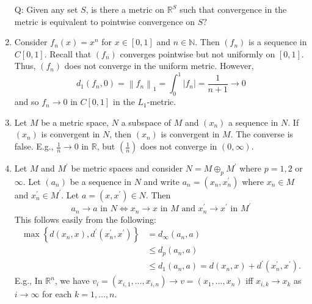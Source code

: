 \documentclass[a4paper,11pt]{article}
\begin{document}
\begin{example}
\begin{enumerate}
        Q: Given any set $S$, is there a metric on $\mathbb{R}^{S}$ such that convergence in the metric is equivalent to pointwise convergence on $S ?$
        \item Consider $f_{n}(x)=x^{n}$ for $x \in[0,1]$ and $n \in \mathbb{N}$. Then $\left(f_{n}\right)$ is a sequence in $C[0,1]$. Recall that $\left(f_{n}\right)$ converges pointwise but not uniformly on $[0,1]$. Thus, $\left(f_{n}\right)$ does not converge in the uniform metric. However,
        \[
        d_{1}\left(f_{n}, 0\right)=\left\|f_{n}\right\|_{1}=\int_{0}^{1}\left|f_{n}\right|=\frac{1}{n+1} \rightarrow 0
        \]
        and so $f_{n} \rightarrow 0$ in $C[0,1]$ in the $L_{1}$-metric.
        \item Let $M$ be a metric space, $N$ a subspace of $M$ and $\left(x_{n}\right)$ a sequence in $N$. If $\left(x_{n}\right)$ is convergent in $N$, then $\left(x_{n}\right)$ is convergent in $M$. The converse is false. E.g., $\frac{1}{n} \rightarrow 0$ in $\mathbb{R}$, but $\left(\frac{1}{n}\right)$ does not converge in $(0, \infty)$.
        \item Let $M$ and $M^{\prime}$ be metric spaces and consider $N=M \oplus_{p} M^{\prime}$ where $p=1,2$ or $\infty$. Let $\left(a_{n}\right)$ be a sequence in $N$ and write $a_{n}=\left(x_{n}, x_{n}^{\prime}\right)$ where $x_{n} \in M$ and $x_{n}^{\prime} \in M^{\prime} .$ Let $a=\left(x, x^{\prime}\right) \in N$. Then
        \[
        a_{n} \rightarrow a \text { in } N \Longleftrightarrow x_{n} \rightarrow x \text { in } M \text { and } x_{n}^{\prime} \rightarrow x^{\prime} \text { in } M^{\prime}
        \]
        This follows easily from the following:
        \[
        \begin{aligned}
        \max \left\{d\left(x_{n}, x\right), d^{\prime}\left(x_{n}^{\prime}, x^{\prime}\right)\right\}&=d_{\infty}\left(a_{n}, a\right) \\
        &\le d_{p}\left(a_{n}, a\right) \\
        & \leqslant d_{1}\left(a_{n}, a\right)=d\left(x_{n}, x\right)+d^{\prime}\left(x_{n}^{\prime}, x^{\prime}\right).
        \end{aligned}
        \]
        E.g., In $\mathbb{R}^{n}$, we have $v_{i}=\left(x_{i, 1}, \ldots, x_{i, n}\right) \rightarrow v=\left(x_{1}, \ldots, x_{n}\right)$ iff $x_{i, k} \rightarrow x_{k}$ as $i \rightarrow \infty$ for each $k=1, \ldots, n$.
    \end{enumerate}
\end{example}
\end{document}
